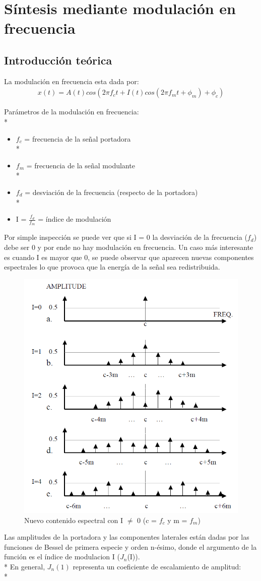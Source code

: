 \documentclass[assd_tp2_main.tex]{subfiles}
\begin{document}
\section{Síntesis mediante modulación en frecuencia}
\subsection*{Introducción teórica}
La modulación en frecuencia esta dada por:
\begin{eqnarray*}
\textstyle x(t)=A(t)cos(2\pi f_c t+I(t)cos(2\pi f_mt+\phi_m)+\phi_c)
\end{eqnarray*}
\par
Parámetros de la modulación en frecuencia:\\*
\begin{itemize}
\item $f_c$ = frecuencia de la señal portadora\\*
\item $f_m$ = frecuencia de la señal modulante\\*
\item $f_d$ = desviación de la frecuencia (respecto de la portadora)\\*
\item I = $\displaystyle \frac{f_d}{f_m}$ = índice de modulación
\end{itemize}

Por simple inspección se puede ver que si I = 0 la desviación de la frecuencia ($f_d$) debe ser 0 y por ende no hay  modulación en frecuencia. Un caso más interesante es cuando I es mayor que 0, se puede observar que aparecen nuevas componentes espectrales lo que provoca que la energía de la señal sea redistribuida.  
\begin{figure}[H]
\centering
\includegraphics[width=0.4\linewidth]{graficos/EJ4/nuevasfreqs.png}
\caption{Nuevo contenido espectral con I $\neq$ 0 (c = $f_c$ y  m = $f_m$)}
\label{fig:nuevasfreqs}
\end{figure}
Las amplitudes de la portadora y las componentes laterales están dadas por las funciones de Bessel de primera especie y orden n-ésimo,
donde el argumento de la función es el índice de modulacion I ($J_{n}$(I)). \\*
En general, $J_{n}(1)$ representa un coeficiente de escalamiento de amplitud: \\*
\end{document}
